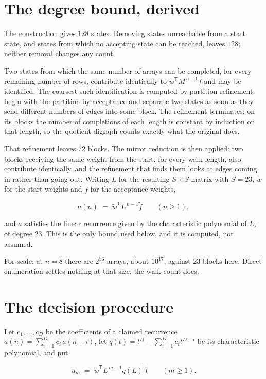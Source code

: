 \documentclass[11pt]{article}
\theoremstyle{definition}
\begin{document}
\section{The degree bound, derived}

The construction gives $128$ states. Removing states unreachable from a start state, and states from which no accepting state can be reached, leaves $128$; neither removal changes any count.

Two states from which the same number of arrays can be completed, for every remaining number of rows, contribute identically to $w^{\mathsf T}M^{\,n-1}f$ and may be identified. The coarsest such identification is computed by partition refinement: begin with the partition by acceptance and separate two states as soon as they send different numbers of edges into some block. The refinement terminates; on its blocks the number of completions of each length is constant by induction on that length, so the quotient digraph counts exactly what the original does.

That refinement leaves $72$ blocks. The mirror reduction is then applied: two blocks receiving the same weight from the start, for every walk length, also contribute identically, and the refinement that finds them looks at edges coming in rather than going out. Writing $L$ for the resulting $S \times S$ matrix with $S = 23$, $\tilde w$ for the start weights and $\tilde f$ for the acceptance weights,

\[a(n) \;=\; \tilde w^{\mathsf T} L^{\,n-1} \tilde f \qquad (n \ge 1),\]

and $a$ satisfies the linear recurrence given by the characteristic polynomial of $L$, of degree $23$. This is the only bound used below, and it is computed, not assumed.

For scale: at $n = 8$ there are $2^{56}$ arrays, about $10^{17}$, against $23$ blocks here. Direct enumeration settles nothing at that size; the walk count does.

\section{The decision procedure}

Let $c_1,\dots,c_D$ be the coefficients of a claimed recurrence $a(n) = \sum_{i=1}^{D} c_i\,a(n-i)$, let $q(t) = t^{D} - \sum_{i=1}^{D} c_i t^{D-i}$ be its characteristic polynomial, and put

\[u_m \;=\; \tilde w^{\mathsf T} L^{\,m-1} q(L)\,\tilde f \qquad (m \ge 1).\]
\end{document}
